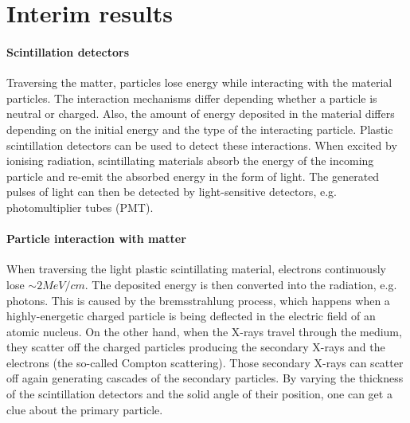 \documentclass[12pt]{article}
\begin{document}
\newpage
\section{Interim results}
\paragraph{Scintillation detectors}
Traversing the matter, particles lose energy while interacting with the material particles. The interaction mechanisms differ depending whether a particle is neutral or charged. Also, the amount of energy deposited in the material differs depending on the initial energy and the type of the interacting particle. Plastic scintillation detectors can be used to detect these interactions. When  excited by ionising radiation, scintillating materials absorb the energy of the incoming particle and re-emit the absorbed energy in the form of light. The generated pulses of light can then be detected by light-sensitive detectors, e.g. photomultiplier tubes (PMT).

\paragraph{Particle interaction with matter}
When traversing the light plastic scintillating material, electrons continuously lose $\sim 2 MeV/cm$. The deposited energy is then converted into the radiation, e.g. photons. This is caused by the bremsstrahlung process, which happens when a highly-energetic charged particle is being deflected in the electric field of an atomic nucleus. On the other hand, when the X-rays travel through the medium, they scatter off the charged particles producing the secondary X-rays and the electrons (the so-called Compton scattering). Those secondary X-rays can scatter off again generating cascades of the secondary particles. By varying the thickness of the scintillation detectors and the solid angle of their position, one can get a clue about the primary particle. 
\end{document}
